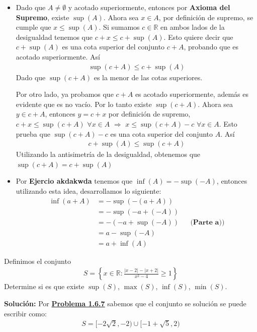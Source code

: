 \documentclass[12pt]{book}
\begin{document}
\begin{itemize}
    \item[\textbf{a)}] Dado que $A\neq \emptyset$ y acotado superiormente, entonces por \textbf{Axioma del Supremo}, existe $\sup(A)$. Ahora sea $x \in A$, por definición de supremo, se cumple que $x \leq \sup(A)$. Si sumamos $c \in \mathbb{R}$ en ambos lados de la desigualdad tenemos que $c+x \leq c + \sup(A)$. Esto quiere decir que $c + \sup(A)$ es una cota superior del conjunto $c+ A$, probando que es acotado superiormente. Así
\begin{align*}
    \sup(c+A)\leq c+\sup(A)
\end{align*}
Dado que $\sup(c+A)$ es la menor de las cotas superiores.

Por otro lado, ya probamos que $c+A$ es acotado superiormente, además es evidente que es no vacío. Por lo tanto existe $\sup(c+A)$. Ahora sea $y \in c+A$, entonces  $y=c+x$ por definición de supremo, $c+x \leq \sup(c+A)$ $\forall x \in A$ $\Longrightarrow$ $x\leq \sup(c+A)-c$ $\forall x \in A$. Esto prueba que $\sup(c+A)-c$ es una cota superior del conjunto $A$. Así
\begin{align*}
    c+\sup(A)\leq \sup(c+A)
\end{align*}
Utilizando la antisimetría de la desigualdad, obtenemos que $\sup(c+A)=c+\sup(A)$

\item[\textbf{b)}] Por \textbf{Ejercio akdakwda} tenemos que $\inf(A)=-\sup(-A)$, entonces utilizando esta idea, desarrollamos lo siguiente:
\begin{align*}
    \inf(a+A)&=-\sup(-(a+A)) \\
    &=-\sup(-a+(-A)) \\
    &=-(-a+\sup(-A)) && \textbf{(Parte a))}\\
    &=a-\sup(-A) \\
    &=a+\inf(A)
\end{align*}
\end{itemize}
\begin{prob}{}{}
Definimos el conjunto
 \begin{align*}
        S=\left\{x  \in \mathbb{R} : \frac{|x-2|-|x+2|}{x^2-4} \geq 1 \right\}
    \end{align*}
    Determine si es que existe $\sup(S)$, $\max(S)$, $\inf(S)$, $\min(S)$.
\end{prob}
\textbf{Solución:}
Por \hyperref[th:prob1.6.7]{\textbf{Problema 1.6.7}} sabemos que el conjunto se solución se puede escribir como:
\begin{align*}
    S =  [-2\sqrt{2},-2) \cup [-1+\sqrt{5},2)
\end{align*}
\end{document}

